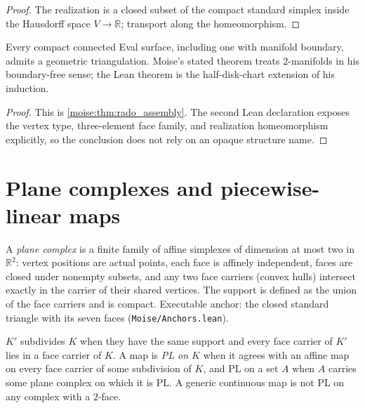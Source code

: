 \begin{proof}
\leanok
The realization is a closed subset of the compact standard simplex inside the
Hausdorff space $V\to\mathbb R$; transport along the homeomorphism.
\end{proof}

\begin{theorem}
\label{moise:thm:moise_triangulation}
\leanok
{}
Every compact connected Eval surface, including one with manifold boundary,
admits a geometric triangulation.  Moise's stated theorem treats $2$-manifolds in his
boundary-free sense; the Lean theorem is the half-disk-chart extension of his
induction.
\end{theorem}

\begin{proof}
\leanok
This is \ref{moise:thm:rado_assembly}.  The second Lean declaration exposes
the vertex type, three-element face family, and realization homeomorphism
explicitly, so the conclusion does not rely on an opaque structure name.
\end{proof}

\section{Plane complexes and piecewise-linear maps}

\begin{definition}
\label{moise:def:plane_complex}
\leanok
A \emph{plane complex} is a finite family of affine simplexes of dimension at
most two in $\mathbb R^2$: vertex positions are actual points, each face is
affinely independent, faces are closed under nonempty subsets, and any two face
carriers (convex hulls) intersect exactly in the carrier of their shared
vertices.  The support is defined as the union of the face carriers and is
compact.  Executable anchor: the closed standard triangle with its seven faces
(\texttt{Moise/Anchors.lean}).
\end{definition}

\begin{definition}
\label{moise:def:pl_maps}
\leanok
{}
$K'$ subdivides $K$ when they have the same support and every face carrier of
$K'$ lies in a face carrier of $K$.  A map is \emph{PL on $K$} when it agrees
with an affine map on every face carrier of some subdivision of $K$, and PL on
a set $A$ when $A$ carries some plane complex on which it is PL.  A generic
continuous map is not PL on any complex with a $2$-face.
\end{definition}

